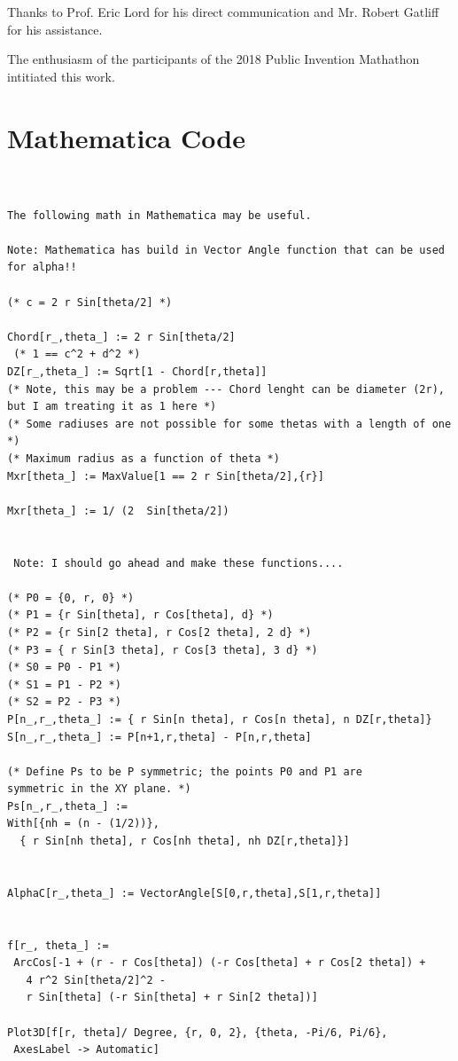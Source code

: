 \documentclass[11pt]{article}
\begin{document}
{Thanks to Prof. Eric Lord for his direct communication and Mr. Robert Gatliff for his
assistance.

The enthusiasm of the participants of the 2018 Public Invention Mathathon
intitiated this work.




\appendix

\section{Mathematica Code}

\begin{verbatim}


The following math in Mathematica may be useful.

Note: Mathematica has build in Vector Angle function that can be used for alpha!!

(* c = 2 r Sin[theta/2] *)

Chord[r_,theta_] := 2 r Sin[theta/2]
 (* 1 == c^2 + d^2 *)
DZ[r_,theta_] := Sqrt[1 - Chord[r,theta]]
(* Note, this may be a problem --- Chord lenght can be diameter (2r), but I am treating it as 1 here *)
(* Some radiuses are not possible for some thetas with a length of one *)
(* Maximum radius as a function of theta *)
Mxr[theta_] := MaxValue[1 == 2 r Sin[theta/2],{r}]

Mxr[theta_] := 1/ (2  Sin[theta/2])


 Note: I should go ahead and make these functions....

(* P0 = {0, r, 0} *)
(* P1 = {r Sin[theta], r Cos[theta], d} *)
(* P2 = {r Sin[2 theta], r Cos[2 theta], 2 d} *)
(* P3 = { r Sin[3 theta], r Cos[3 theta], 3 d} *)
(* S0 = P0 - P1 *)
(* S1 = P1 - P2 *)
(* S2 = P2 - P3 *)
P[n_,r_,theta_] := { r Sin[n theta], r Cos[n theta], n DZ[r,theta]}
S[n_,r_,theta_] := P[n+1,r,theta] - P[n,r,theta]

(* Define Ps to be P symmetric; the points P0 and P1 are
symmetric in the XY plane. *)
Ps[n_,r_,theta_] :=
With[{nh = (n - (1/2))},
  { r Sin[nh theta], r Cos[nh theta], nh DZ[r,theta]}]


AlphaC[r_,theta_] := VectorAngle[S[0,r,theta],S[1,r,theta]]


f[r_, theta_] := 
 ArcCos[-1 + (r - r Cos[theta]) (-r Cos[theta] + r Cos[2 theta]) + 
   4 r^2 Sin[theta/2]^2 - 
   r Sin[theta] (-r Sin[theta] + r Sin[2 theta])]

Plot3D[f[r, theta]/ Degree, {r, 0, 2}, {theta, -Pi/6, Pi/6}, 
 AxesLabel -> Automatic]



\end{verbatim}}
\end{document}

